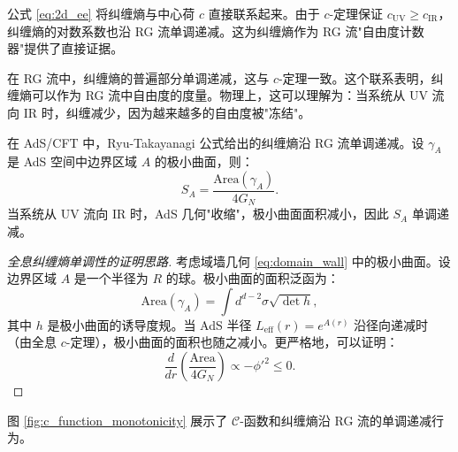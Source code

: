 \begin{remark}
公式 \eqref{eq:2d_ee} 将纠缠熵与中心荷 $c$ 直接联系起来。由于 $c$-定理保证 $c_{\text{UV}} \geq c_{\text{IR}}$，纠缠熵的对数系数也沿 RG 流单调递减。这为纠缠熵作为 RG 流"自由度计数器"提供了直接证据。
\end{remark}

\begin{note}
在 RG 流中，纠缠熵的普遍部分单调递减，这与 $c$-定理一致。这个联系表明，纠缠熵可以作为 RG 流中自由度的度量。物理上，这可以理解为：当系统从 UV 流向 IR 时，纠缠减少，因为越来越多的自由度被"冻结"。
\end{note}

\begin{theorem}[全息纠缠熵的单调性]\label{thm:holo_ee_monotonicity}
在 AdS/CFT 中，Ryu-Takayanagi 公式给出的纠缠熵沿 RG 流单调递减。设 $\gamma_A$ 是 AdS 空间中边界区域 $A$ 的极小曲面，则：
\begin{equation}
    S_A = \frac{\text{Area}(\gamma_A)}{4G_N}.
\end{equation}
当系统从 UV 流向 IR 时，AdS 几何"收缩"，极小曲面面积减小，因此 $S_A$ 单调递减。
\end{theorem}

\begin{proof}[全息纠缠熵单调性的证明思路]
考虑域墙几何 \eqref{eq:domain_wall} 中的极小曲面。设边界区域 $A$ 是一个半径为 $R$ 的球。极小曲面的面积泛函为：
\begin{equation}
    \text{Area}(\gamma_A) = \int d^{d-2}\sigma \sqrt{\det h},
\end{equation}
其中 $h$ 是极小曲面的诱导度规。当 AdS 半径 $L_{\text{eff}}(r) = e^{A(r)}$ 沿径向递减时（由全息 $c$-定理），极小曲面的面积也随之减小。更严格地，可以证明：
\begin{equation}
    \frac{d}{dr}\left(\frac{\text{Area}}{4G_N}\right) \propto -\phi'^2 \leq 0.
\end{equation}
\end{proof}

图 \ref{fig:c_function_monotonicity} 展示了 $\mathcal{C}$-函数和纠缠熵沿 RG 流的单调递减行为。

